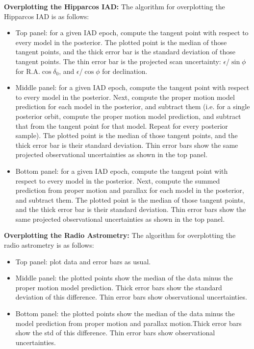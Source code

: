 \documentclass[twocolumn]{aastex631}
\begin{document}
\textbf{Overplotting the Hipparcos IAD:} The algorithm for overplotting the Hipparcos IAD is as follows:

\begin{itemize}
    \item Top panel: for a given IAD epoch, compute the tangent point with respect to every model in the posterior. The plotted point is the median of those tangent points, and the thick error bar is the standard deviation of those tangent points. The thin error bar is the projected scan uncertainty: $\epsilon$/$\sin{\phi}$ for R.A.$\cos{\delta_0}$, and $\epsilon$/$\cos{\phi}$ for declination. 
    \item Middle panel: for a given IAD epoch, compute the tangent point with respect to every model in the posterior. Next, compute the proper motion model prediction for each model in the posterior, and subtract them (i.e. for a single posterior orbit, compute the proper motion model prediction, and subtract that from the tangent point for that model. Repeat for every posterior sample). The plotted point is the median of those tangent points, and the thick error bar is their standard deviation. Thin error bars show the same projected observational uncertainties as shown in the top panel.
    \item Bottom panel: for a given IAD epoch, compute the tangent point with respect to every model in the posterior. Next, compute the summed prediction from proper motion and parallax for each model in the posterior, and subtract them. The plotted point is the median of those tangent points, and the thick error bar is their standard deviation. Thin error bars show the same projected observational uncertainties as shown in the top panel.
\end{itemize}

\textbf{Overplotting the Radio Astrometry:} The algorithm for overplotting the radio astrometry is as follows:

\begin{itemize}
    \item Top panel: plot data and error bars as usual.
    \item Middle panel: the plotted points show the median of the data minus the proper motion model prediction. Thick error bars show the standard deviation of this difference. Thin error bars show observational uncertainties. 
    \item Bottom panel: the plotted points show the median of the data minus the model prediction from proper motion and parallax motion.Thick error bars show the std of this difference. Thin error bars show observational uncertainties. 
\end{itemize}
\end{document}
